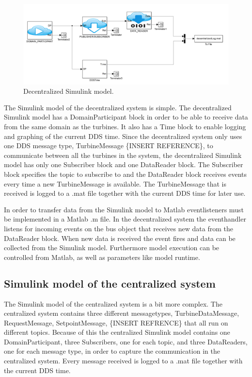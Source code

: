 \begin{figure}[b]
\includegraphics[width=\textwidth]{figures/DecentralizedModel}
	\caption[Decentralized Simulink model]{
		\label{fig:decentralizedSimulinkModel} 
		\footnotesize{%
			Decentralized Simulink model.
		}
	}
\end{figure}

The Simulink model of the decentralized system is simple. The decentralized Simulink model has a DomainParticipant block in order to be able to receive data from the same domain as the turbines. It also has a Time block to enable logging and graphing of the current DDS time. Since the decentralized system only uses one DDS message type, TurbineMessage \{INSERT REFERENCE\}, to communicate between all the turbines in the system, the decentralized Simulink model has only one Subscriber block and one DataReader block. The Subscriber block specifies the topic to subscribe to and the DataReader block receives events every time a new TurbineMessage is available. The TurbineMessage that is received is logged to a .mat file together with the current DDS time for later use.

In order to transfer data from the Simulink model to Matlab eventlisteners must be implemented in a Matlab .m file. In the decentralized system the eventhandler listens for incoming events on the bus object that receives new data from the DataReader block. When new data is received the event fires and data can be collected from the Simulink model. Furthermore model execution can be controlled from Matlab, as well as parameters like model runtime.

\subsection{Simulink model of the centralized system}\label{subsec:centralizedmodel}
The Simulink model of the centralized system is a bit more complex. The centralized system contains three different messagetypes, TurbineDataMessage, RequestMessage, SetpointMessage, \{INSERT REFRENCE\} that all run on different topics. Because of this the centralized Simulink model contains one DomainParticipant, three Subscribers, one for each topic, and three DataReaders, one for each message type, in order to capture the communication in the centralized system. Every message received is logged to a .mat file together with the current DDS time.

